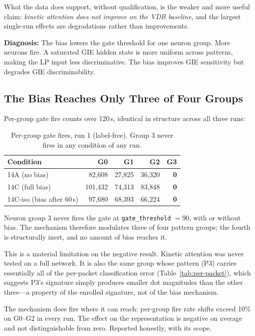 \documentclass[11pt,letterpaper]{article}
\begin{document}
What the data does support, without qualification, is the weaker and more useful claim: \emph{kinetic attention does not improve on the VDB baseline}, and the largest single-run effects are degradations rather than improvements.

\textbf{Diagnosis:} The bias lowers the gate threshold for one neuron group. More neurons fire. A saturated GIE hidden state is more uniform across patterns, making the LP input less discriminative. The bias improves GIE sensitivity but degrades GIE discriminability.

\subsection{The Bias Reaches Only Three of Four Groups}
\label{sec:g3}

Per-group gate fire counts over 120\,s, identical in structure across all three runs:

\begin{table}[h]
\centering
\begin{tabular}{l rrrr}
\toprule
Condition & G0 & G1 & G2 & G3 \\
\midrule
14A (no bias)             & 82{,}608 & 27{,}825 & 36{,}320 & \textbf{0} \\
14C (full bias)           & 101{,}432 & 74{,}313 & 83{,}848 & \textbf{0} \\
14C-iso (bias after 60\,s) & 97{,}680 & 68{,}393 & 66{,}224 & \textbf{0} \\
\bottomrule
\end{tabular}
\caption{Per-group gate fires, run 1 (label-free). Group 3 never fires in any condition of any run.}
\label{tab:fires}
\end{table}

Neuron group 3 never fires the gate at \texttt{gate\_threshold} $=90$, with or without bias. The mechanism therefore modulates three of four pattern groups; the fourth is structurally inert, and no amount of bias reaches it.

This is a material limitation on the negative result. Kinetic attention was never tested on a full network. It is also the same group whose pattern (P3) carries essentially all of the per-packet classification error (Table~\ref{tab:per-packet}), which suggests P3's signature simply produces smaller dot magnitudes than the other three---a property of the enrolled signature, not of the bias mechanism.

The mechanism does fire where it can reach: per-group fire rate shifts exceed 10\% on G0--G2 in every run. The effect on the representation is negative on average and not distinguishable from zero. Reported honestly, with its scope.
\end{document}

